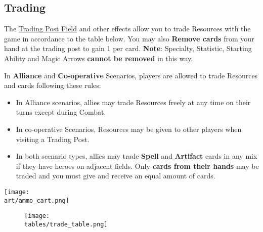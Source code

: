 \begin{multicols}{2}

\subsection*{\hypertarget{Trading}{Trading}}

The \hyperlink{Trading Post}{Trading Post Field} and other effects allow you to trade Resources with the game in accordance to the table below.
You may also \textbf{Remove cards} from your hand at the trading post to gain 1  per card.
\textbf{Note}: Specialty, Statistic, Starting Ability and Magic Arrows \textbf{cannot be removed} in this way.\par
In \textbf{Alliance} and \textbf{Co-operative} Scenarios, players are allowed to trade Resources and cards following these rules:
\begin{itemize}
  \item In Alliance scenarios, allies may trade Resources freely at any time on their turns except during Combat.
  \item In co-operative Scenarios, Resources may be given to other players when visiting a Trading Post.
  \item In both scenario types, allies may trade \textbf{Spell} and \textbf{Artifact} cards in any mix if they have heroes on adjacent fields.
    Only \textbf{cards from their hands} may be traded and you must give and receive an equal amount of cards.
\end{itemize}

\vspace*{\fill}
\texttt{[image: \\art/ammo\_cart.png]}

\end{multicols}

\vfill
\begin{figure*}[!hb]
  \centering
  \texttt{[image: \\tables/trade\_table.png]}
\end{figure*}
\vfill

\clearpage

